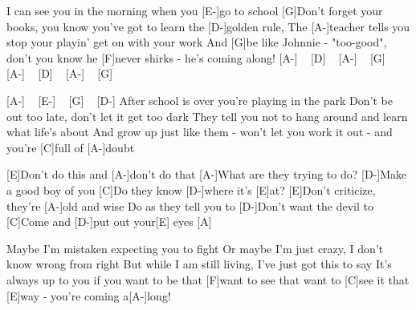 
\begin{guitar}
[A-]I can see you in the morning when you [E-]go to school
[G]Don't forget your books, you know you've got to learn the [D-]golden rule,
The [A-]teacher tells you stop your playin' get on with your work
And [G]be like Johnnie - "too-good", don't you know he [F]never shirks
- he's coming along! [A-] ~ [D] ~ [A-] ~ [G] ~ [A-] ~ [D] ~ [A-] ~ [G]

[A-] ~ [E-] ~ [G] ~ [D-]
After school is over you're playing in the park
Don't be out too late, don't let it get too dark
They tell you not to hang around and learn what life's about
And grow up just like them - won't let you work it out
- and you're [C]full of [A-]doubt

[E]Don't do this and [A-]don't do that
[A-]What are they trying to do? [D-]Make a good boy of you
[C]Do they know [D-]where it's [E]at?
[E]Don't criticize, they're [A-]old and wise
Do as they tell you to
[D-]Don't want the devil to
[C]Come and [D-]put out your[E] eyes [A]

Maybe I'm mistaken expecting you to fight
Or maybe I'm just crazy, I don't know wrong from right
But while I am still living, I've just got this to say
It's always up to you if you want to be that
[F]want to see that
want to [C]see it that [E]way
- you're coming a[A-]long! 
\end{guitar}